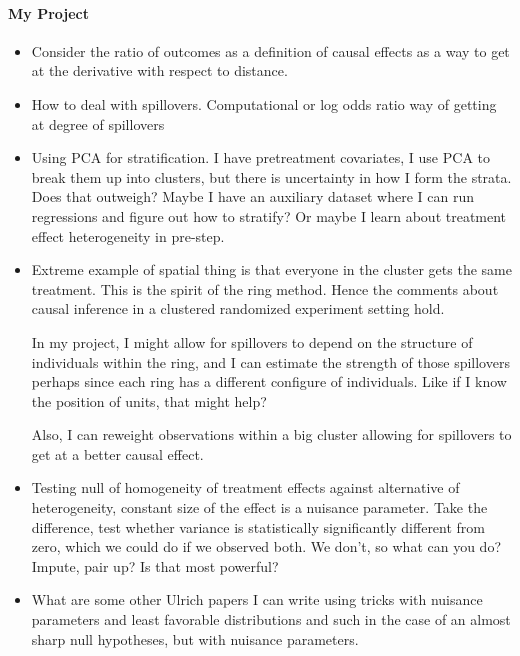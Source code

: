 \documentclass[12pt]{article}
\theoremstyle{plain}
\theoremstyle{definition}
\theoremstyle{remark}
\begin{document}
\paragraph{My Project}
\begin{itemize}
  \item Consider the ratio of outcomes as a definition of causal effects
    as a way to get at the derivative with respect to distance.
  \item How to deal with spillovers.
    Computational or log odds ratio way of getting at degree of
    spillovers
  \item Using PCA for stratification.
    I have pretreatment covariates,
    I use PCA to break them up into clusters,
    but there is uncertainty in how I form the strata.
    Does that outweigh?
    Maybe I have an auxiliary dataset where I can run regressions and
    figure out how to stratify?
    Or maybe I learn about treatment effect heterogeneity in pre-step.

  \item
    Extreme example of spatial thing is that everyone in the cluster
    gets the same treatment.
    This is the spirit of the ring method.
    Hence the comments about causal inference in a clustered randomized
    experiment setting hold.

    In my project, I might allow for spillovers to depend on the
    structure of individuals within the ring, and I can estimate the
    strength of those spillovers perhaps since each ring has a different
    configure of individuals.
    Like if I know the position of units, that might help?

    Also, I can reweight observations within a big cluster allowing for
    spillovers to get at a better causal effect.

  \item
    Testing null of homogeneity of treatment effects against alternative
    of heterogeneity, constant size of the effect is a nuisance
    parameter.
    Take the difference, test whether variance is statistically
    significantly different from zero, which we could do if we observed
    both.
    We don't, so what can you do?
    Impute, pair up?
    Is that most powerful?

  \item
    What are some other Ulrich papers I can write using tricks with
    nuisance parameters and least favorable distributions and such in
    the case of an almost sharp null hypotheses, but with nuisance
    parameters.



\end{itemize}
\end{document}
